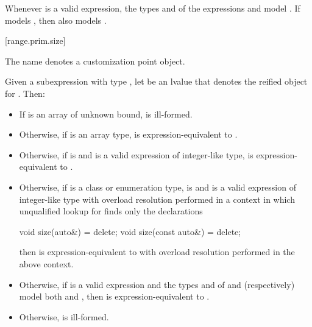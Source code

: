 \pnum
\begin{note}
Whenever  is a valid expression,
the types  and  of the expressions
 and 
model .
If  models ,
then  also models .
\end{note}

[range.prim.size]{}
%

\pnum
The name  denotes a customization point
object.

\pnum
Given a subexpression  with type ,
let  be an lvalue that denotes the reified object for .
Then:

\begin{itemize}
\item
  If  is an array of unknown bound,
   is ill-formed.

\item
  Otherwise, if  is an array type,
   is expression-equivalent to
  .

\item
  Otherwise, if 
  is  and
  is a valid expression of integer-like type,
   is expression-equivalent to
  .

\item
  Otherwise, if  is a class or enumeration type,
   is  and
  is a valid expression of integer-like type
  with overload resolution performed in a context in which
  unqualified lookup for  finds only the declarations
\begin{codeblock}
void size(auto&) = delete;
void size(const auto&) = delete;
\end{codeblock}
  then  is expression-equivalent to
  with overload resolution performed in the above context.

\item
  Otherwise, if
  is a valid expression and
  the types  and  of  and
   (respectively) model both
   and
  ,
  then  is expres\-sion-equivalent to
  .

\item
  Otherwise,  is ill-formed.
\end{itemize}


